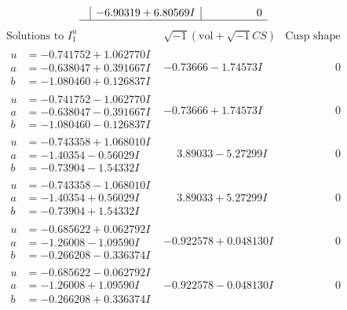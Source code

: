\documentclass[1p]{elsarticle_modified}
\theoremstyle{definition}
\newcommand{\I}{\sqrt{-1}}
\begin{document}
$$\begin{array}{c|c|c}
 & -6.90319 + 6.80569 I & \phantom{-0.000000 } 0\\
 \hline 
 \end{array}$$\newpage$$\begin{array}{c|c|c}  
\text{Solutions to }I^u_{1}& \I (\text{vol} + \sqrt{-1}CS) & \text{Cusp shape}\\
 \hline 
\begin{aligned}
u &= -0.741752 + 1.062770 I \\
a &= -0.638047 + 0.391667 I \\
b &= -1.080460 + 0.126837 I\end{aligned}
 & -0.73666 - 1.74573 I & \phantom{-0.000000 } 0 \\ \hline\begin{aligned}
u &= -0.741752 - 1.062770 I \\
a &= -0.638047 - 0.391667 I \\
b &= -1.080460 - 0.126837 I\end{aligned}
 & -0.73666 + 1.74573 I & \phantom{-0.000000 } 0 \\ \hline\begin{aligned}
u &= -0.743358 + 1.068010 I \\
a &= -1.40354 - 0.56029 I \\
b &= -0.73904 - 1.54332 I\end{aligned}
 & \phantom{-}3.89033 - 5.27299 I & \phantom{-0.000000 } 0 \\ \hline\begin{aligned}
u &= -0.743358 - 1.068010 I \\
a &= -1.40354 + 0.56029 I \\
b &= -0.73904 + 1.54332 I\end{aligned}
 & \phantom{-}3.89033 + 5.27299 I & \phantom{-0.000000 } 0 \\ \hline\begin{aligned}
u &= -0.685622 + 0.062792 I \\
a &= -1.26008 - 1.09590 I \\
b &= -0.266208 - 0.336374 I\end{aligned}
 & -0.922578 + 0.048130 I & \phantom{-0.000000 } 0 \\ \hline\begin{aligned}
u &= -0.685622 - 0.062792 I \\
a &= -1.26008 + 1.09590 I \\
b &= -0.266208 + 0.336374 I\end{aligned}
 & -0.922578 - 0.048130 I & \phantom{-0.000000 } 0 \\ \hline\begin{aligned}

\end{aligned}
\end{array}$$
\end{document}
